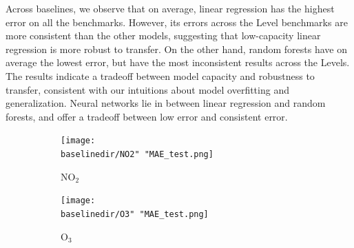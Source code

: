 \documentclass[journal abbreviation, manuscript]{copernicus}
\newcommand{\textus}[1]{$_{\text{#1}}$}
\begin{document}
Across baselines, we observe that on average, linear regression has the highest error on all the benchmarks. However, its errors across the Level benchmarks are more consistent than the other models, suggesting that low-capacity linear regression is more robust to transfer. On the other hand, random forests have on average the lowest error, but have the most inconsistent results across the Levels. The results indicate a tradeoff between model capacity and robustness to transfer, consistent with our intuitions about model overfitting and generalization. Neural networks lie in between linear regression and random forests, and offer a tradeoff between low error and consistent error. 

\begin{figure}[H]
\centering
\begin{subfigure}{0.45\textwidth}
\texttt{[image: \\baselinedir/NO2" "MAE\_test.png]}
\caption{NO\textus{2}}
\end{subfigure}
\begin{subfigure}{0.45\textwidth}
\texttt{[image: \\baselinedir/O3" "MAE\_test.png]}
\caption{O\textus{3}}
\end{subfigure}
\caption{}
\label{fig:results-linear}
\end{figure}

\iffalse
\end{document}
